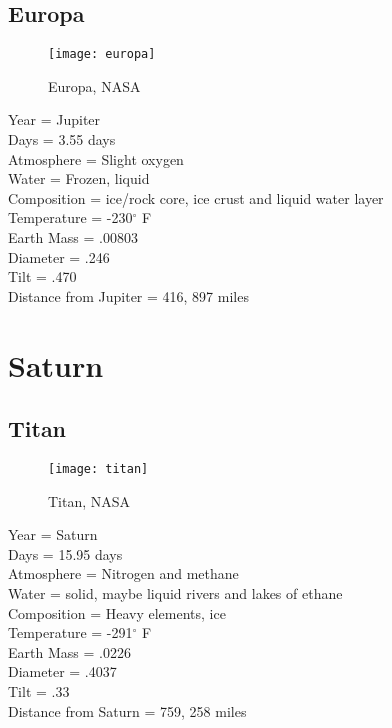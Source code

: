 \documentclass[12pt]{book}
\begin{document}
\subsection{Europa}
 \begin{wrapfigure}{R}{0.4\textwidth}
         \vspace{-1cm}
        \begin{center}
        \texttt{[image: europa]}\caption{\scriptsize Europa, NASA}
        \end{center}
         \vspace{-1cm}
    \end{wrapfigure}
Year = Jupiter\\
Days = 3.55 days\\
Atmosphere = Slight oxygen\\
Water = Frozen, liquid\\
Composition = ice/rock core, ice crust and liquid water layer\\
Temperature = -230$^{\circ}$ F\\
Earth Mass = .00803\\
Diameter = .246\\ 
Tilt = .470\\
Distance from Jupiter = 416, 897 miles\\
\section{Saturn}
\subsection{Titan}
 \begin{wrapfigure}{R}{0.4\textwidth}
         \vspace{-1cm}
        \begin{center}
        \texttt{[image: titan]}\caption{\scriptsize Titan, NASA}
        \end{center}
         \vspace{-1cm}
    \end{wrapfigure}
Year = Saturn\\
Days =  15.95 days\\
Atmosphere = Nitrogen and methane\\
Water = solid, maybe liquid rivers and lakes of ethane\\
Composition = Heavy elements, ice\\
Temperature = -291$^{\circ}$ F\\
Earth Mass = .0226\\
Diameter = .4037\\ 
Tilt = .33\\
Distance from Saturn = 759, 258 miles\\
\newpage
\end{document}
